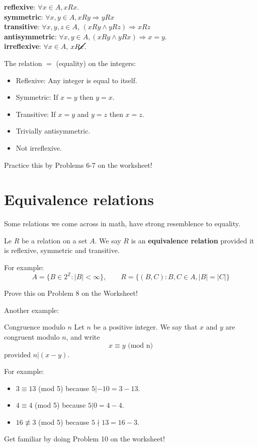 \documentclass{beamer}
\def\bl[#1]#2{\begin{block}{#1}#2\end{block}}
\def\integers{\mathbb{Z}}
\def\itemb{\begin{itemize}}
\def\iteme{\end{itemize}}
\begin{document}
\begin{frame}
\bl[]{
\textbf{reflexive}: $\forall x\in A, x R x$.\\
\textbf{symmetric}: $\forall x,y\in A, xRy\Rightarrow y R x$\\
\textbf{transitive}: $\forall x,y,z\in A$, $(xRy\wedge yRz)\Rightarrow xRz$\\
\textbf{antisymmetric}: $\forall x,y\in A, (xRy\wedge yRx)\Rightarrow x=y$.\\
\textbf{irreflexive}: $\forall x\in A$, $x\cancel{R} x$.}
The relation $=$ (equality) on the integers:
\itemb
\item Reflexive: Any integer is equal to itself.
\item Symmetric: If $x=y$ then $y=x$.
\item Transitive: If $x=y$ and $y=z$ then $x=z$.
\item Trivially antisymmetric.
\item Not irreflexive.
\iteme

\begin{center}
Practice this by Problems 6-7 on the worksheet!
\end{center}
\end{frame}

\section{Equivalence relations}

\begin{frame}
Some relations we come across in math, have strong resemblence to equality.
\begin{Definition}
Le $R$ be a relation on a set $A$. We say $R$ is an \textbf{equivalence relation} provided it is reflexive, symmetric and transitive.
\end{Definition}
For example:
\[
A=\{B\in 2^{\integers}: |B|<\infty\}, \qquad R=\{(B,C): B,C \in A, |B|=|C|\}
\]

\begin{center}
Prove this on Problem 8 on the Worksheet!
\end{center}
\end{frame}

\begin{frame}
Another example:
\bl[Congruence modulo $n$]{
Let $n$ be a positive integer. We say that $x$ and $y$ are congruent modulo $n$, and write 
\[
x\equiv y \textrm{ (mod n)}
\]
provided $n|(x-y)$.
}
For example:
\itemb
\item $3\equiv 13$ (mod 5) because $5|-10=3-13$.
\item $4\equiv 4$ (mod 5) because $5|0=4-4$.
\item $16\not\equiv 3$ (mod 5) because $5\nmid 13=16-3$.
\iteme

\begin{center}
Get familiar by doing Problem 10 on the worksheet!
\end{center}
\end{frame}
\end{document}
